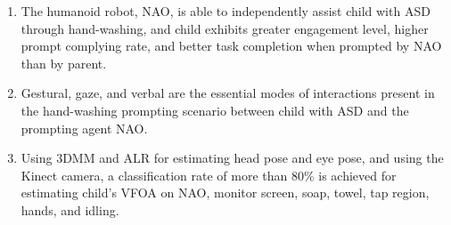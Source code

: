 \begin{enumerate}
	\item The humanoid robot, NAO, is able to independently assist child with ASD through hand-washing, and child exhibits greater engagement level, higher prompt complying rate, and better task completion when prompted by NAO than by parent.
	
	\item Gestural, gaze, and verbal are the essential modes of interactions present in the hand-washing prompting scenario between child with ASD and the prompting agent NAO.
	
	\item Using 3DMM and ALR for estimating head pose and eye pose, and using the Kinect camera, a classification rate of more than 80\% is achieved for estimating child's VFOA on NAO, monitor screen, soap, towel, tap region, hands, and idling.
	
\end{enumerate}
